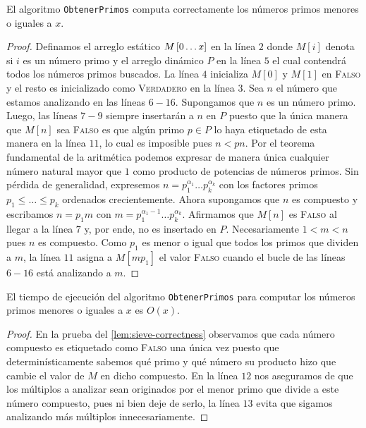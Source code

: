 \begin{lemma}
    \label{lem:sieve-correctness}
    El algoritmo \texttt{ObtenerPrimos}
    computa correctamente los n\'umeros primos
    menores o iguales a \(x\).
\end{lemma}

\begin{proof}
    Definamos el arreglo est\'atico
    \(M\left[ 0 \dots x \right]\) en la l\'inea \(2\)
    donde \(M[i]\) denota si \(i\) es un n\'umero primo
    y el arreglo din\'amico \(P\) en la l\'inea \(5\)
    el cual contendr\'a todos los n\'umeros primos buscados.
    La l\'inea \(4\) inicializa \(M[0]\) y \(M[1]\) en \textsc{Falso}
    y el resto es inicializado como \textsc{Verdadero} en la l\'inea \(3\).
    Sea \(n\) el n\'umero que estamos analizando en las l\'ineas \(6-16\).
    Supongamos que \(n\) es un n\'umero primo.
    Luego, las l\'ineas \(7-9\) siempre insertar\'an
    a \(n\) en \(P\) puesto que la \'unica manera que \(M[n]\) sea \textsc{Falso}
    es que alg\'un primo \(p \in P\) lo haya etiquetado de esta manera
    en la l\'inea \(11\), lo cual es imposible pues \(n < pn\).
    Por el teorema fundamental de la aritm\'etica
    podemos expresar de manera \'unica
    cualquier n\'umero natural mayor que \(1\) como
    producto de potencias de n\'umeros primos.
    Sin p\'erdida de generalidad, expresemos
    \(n = p_1^{\alpha_1} \dots p_k^{\alpha_k}\)
    con los factores primos \(p_1 \leq \dots \leq p_k\) ordenados crecientemente.
    Ahora supongamos que \(n\) es compuesto y escribamos
    \(n = p_1 m\) con \(m = p_1^{\alpha_1 - 1} \dots p_k^{\alpha_k}\).
    Afirmamos que \(M[n]\) es \textsc{Falso} al llegar a la l\'inea \(7\)
    y, por ende, no es insertado en \(P\).
    Necesariamente \(1 < m < n\) pues \(n\) es compuesto.
    Como \(p_1\) es menor o igual que
    todos los primos que dividen a \(m\),
    la l\'inea \(11\) asigna a \(M[m p_1]\)
    el valor \textsc{Falso}
    cuando el bucle de las l\'ineas \(6-16\)
    est\'a analizando a \(m\).
\end{proof}

\begin{lemma}
    \label{lem:sieve-time}
    El tiempo de ejecuci\'on del algoritmo \texttt{ObtenerPrimos}
    para computar los n\'umeros primos menores o iguales a \(x\) es \(O(x)\).
\end{lemma}

\begin{proof}
    En la prueba del \cref{lem:sieve-correctness} observamos que
    cada n\'umero compuesto es etiquetado como \textsc{Falso}
    una \'unica vez puesto que determin\'isticamente sabemos qu\'e primo
    y qu\'e n\'umero su producto hizo que cambie el valor de \(M\) en dicho compuesto.
    En la l\'inea \(12\) nos aseguramos de que los m\'ultiplos a analizar
    sean originados por el menor primo que divide a este n\'umero compuesto,
    pues ni bien deje de serlo,
    la l\'inea \(13\) evita
    que sigamos analizando m\'as m\'ultiplos innecesariamente.
\end{proof}

